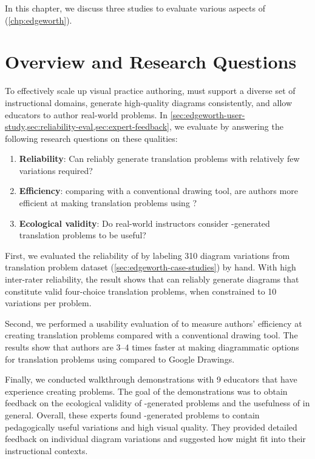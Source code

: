 In this chapter, we discuss three studies to evaluate various aspects of \Edgeworth (\cref{chp:edgeworth}).

\section{Overview and Research Questions}

To effectively scale up visual practice authoring, \Edgeworth must support a diverse set of instructional domains, generate high-quality diagrams consistently, and allow educators to author real-world problems. In \cref{sec:edgeworth-user-study,sec:reliability-eval,sec:expert-feedback}, we evaluate \Edgeworth by answering the following research questions on these qualities:

\begin{enumerate}[label=RQ\arabic*]
    \item\label{rq:mut} \textbf{Reliability}: Can \Edgeworth reliably generate translation problems with relatively few variations required?
    \item\label{rq:eff} \textbf{Efficiency}: comparing with a conventional drawing tool, are authors more efficient at making translation problems using \Edgeworth? 
    \item\label{rq:eco} \textbf{Ecological validity}: Do real-world instructors consider \Edgeworth-generated translation problems to be useful? 
\end{enumerate}

First, we evaluated the reliability of \Edgeworth by labeling 310 diagram variations from translation problem dataset (\cref{sec:edgeworth-case-studies}) by hand. With high inter-rater reliability, the result shows that \Edgeworth can reliably generate diagrams that constitute valid four-choice translation problems, when constrained to 10 variations per problem.

Second, we performed a usability evaluation of \Edgeworth to measure authors' efficiency at creating translation problems compared with a conventional drawing tool. The results show that authors are 3--4 times faster at making diagrammatic options for translation problems using \Edgeworth compared to Google Drawings. 

Finally, we conducted walkthrough demonstrations with 9 educators that have experience creating problems. The goal of the demonstrations was to obtain feedback on the ecological validity of \Edgeworth-generated problems and the usefulness of \Edgeworth in general. Overall, these experts found \Edgeworth-generated problems to contain pedagogically useful variations and high visual quality. They provided detailed feedback on individual diagram variations and suggested how \Edgeworth might fit into their instructional contexts. 

